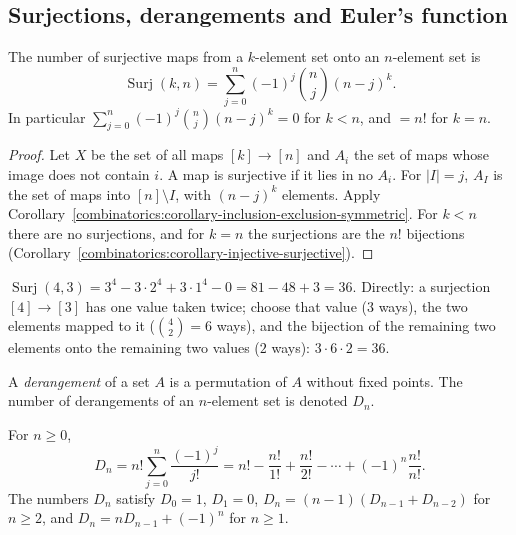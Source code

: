 \subsection{Surjections, derangements and Euler's function}\label{combinatorics:subsection-applications-inclusion-exclusion}

\begin{theorem}[Surjections]\label{combinatorics:theorem-surjections}
The number of surjective maps from a $k$-element set onto an $n$-element set is
\[
\operatorname{Surj}(k, n) = \sum_{j=0}^{n}(-1)^j\binom{n}{j}(n - j)^k .
\]
In particular $\sum_{j=0}^{n}(-1)^j\binom{n}{j}(n - j)^k = 0$ for $k < n$, and $= n!$ for $k = n$.
\end{theorem}

\begin{proof}
Let $X$ be the set of all maps $[k] \to [n]$ and $A_i$ the set of maps whose image does not contain $i$. A map is surjective if it lies in no $A_i$. For $|I| = j$, $A_I$ is the set of maps into
$[n] \setminus I$, with $(n - j)^k$ elements. Apply Corollary~\ref{combinatorics:corollary-inclusion-exclusion-symmetric}. For $k < n$ there are no surjections, and for $k = n$ the surjections are the
$n!$ bijections (Corollary~\ref{combinatorics:corollary-injective-surjective}).
\end{proof}

\begin{example}\label{combinatorics:example-surjections}
$\operatorname{Surj}(4, 3) = 3^4 - 3 \cdot 2^4 + 3 \cdot 1^4 - 0 = 81 - 48 + 3 = 36$. Directly: a surjection $[4] \to [3]$ has one value taken twice; choose that value ($3$ ways), the two elements mapped
to it ($\binom{4}{2} = 6$ ways), and the bijection of the remaining two elements onto the remaining two values ($2$ ways): $3 \cdot 6 \cdot 2 = 36$.
\end{example}

\begin{definition}\label{combinatorics:definition-derangement}
A \emph{derangement} of a set $A$ is a permutation of $A$ without fixed points. The number of derangements of an $n$-element set is denoted $D_n$.
\end{definition}

\begin{theorem}[Derangements]\label{combinatorics:theorem-derangements}
For $n \geq 0$,
\[
D_n = n!\sum_{j=0}^{n}\frac{(-1)^j}{j!} = n! - \frac{n!}{1!} + \frac{n!}{2!} - \cdots + (-1)^n\frac{n!}{n!}.
\]
The numbers $D_n$ satisfy $D_0 = 1$, $D_1 = 0$, $D_n = (n - 1)(D_{n-1} + D_{n-2})$ for $n \geq 2$, and $D_n = nD_{n-1} + (-1)^n$ for $n \geq 1$.
\end{theorem}


